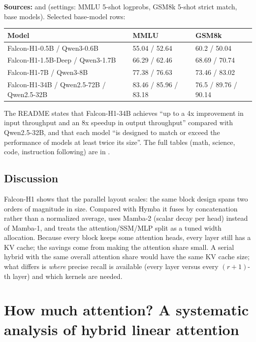 \begin{results}
\textbf{Sources:}  and
 (settings: MMLU 5-shot logprobs, GSM8k
5-shot strict match, base models). Selected base-model rows:
\begin{center}\small
\begin{tabular}{@{}lll@{}}
\toprule
Model & MMLU & GSM8k \\
\midrule
Falcon-H1-0.5B / Qwen3-0.6B & 55.04 / 52.64 & 60.2 / 50.04 \\
Falcon-H1-1.5B-Deep / Qwen3-1.7B & 66.29 / 62.46 & 68.69 / 70.74 \\
Falcon-H1-7B / Qwen3-8B & 77.38 / 76.63 & 73.46 / 83.02 \\
Falcon-H1-34B / Qwen2.5-72B / Qwen2.5-32B & 83.46 / 85.96 / 83.18 & 76.5 / 89.76 / 90.14 \\
\bottomrule
\end{tabular}
\end{center}
The README states that Falcon-H1-34B achieves ``up to a 4x improvement in input throughput and an
8x speedup in output throughput'' compared with Qwen2.5-32B, and that each model ``is designed to
match or exceed the performance of models at least twice its size''. The full tables (math,
science, code, instruction following) are in .
\end{results}

\subsection{Discussion}

Falcon-H1 shows that the parallel layout scales: the same block design spans two orders of
magnitude in size. Compared with Hymba it fuses by concatenation rather than a normalized
average, uses Mamba-2 (scalar decay per head) instead of Mamba-1, and treats the attention/SSM/MLP
split as a tuned width allocation. Because every block keeps some attention heads, every layer
still has a KV cache; the savings come from making the attention share small. A serial hybrid
with the same overall attention share would have the same KV cache size; what differs is
\emph{where} precise recall is available (every layer versus every $(r+1)$-th layer) and which
kernels are needed.

\section{How much attention? A systematic analysis of hybrid linear attention}\label{sec:c12-analysis}

